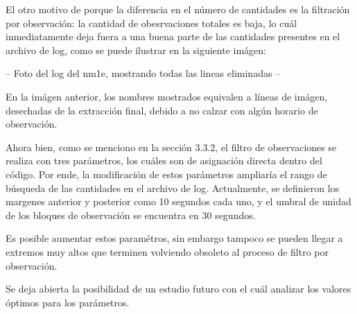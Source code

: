 El otro motivo de porque la diferencia en el número de cantidades es la filtración por observación: la cantidad de obesrvaciones totales es baja, lo cuál inmediatamente deja fuera a una buena parte de las cantidades presentes en el archivo de log, como se puede ilustrar en la siguiente imágen:

-- Foto del log del nm1e, mostrando todas las lineas eliminadas --

En la imágen anterior, los nombres mostrados equivalen a líneas de imágen, desechadas de la extracción final, debido a no calzar con algún horario de observación.

Ahora bien, como se menciono en la sección 3.3.2, el filtro de observaciones se realiza con tres parámetros, los cuáles son de asignación directa dentro del código. Por ende, la modificación de estos parámetros ampliaría el rango de búsqueda de las cantidades en el archivo de log. Actualmente, se definieron los margenes anterior y posterior como 10 segundos cada uno, y el umbral de unidad de los bloques de observación se encuentra en 30 segundos.

Es posible aumentar estos paramétros, sin embargo tampoco se pueden llegar a extremos muy altos que terminen volviendo obsoleto al proceso de filtro por observación.

Se deja abierta la posibilidad de un estudio futuro con el cuál analizar los valores óptimos para los parámetros.
